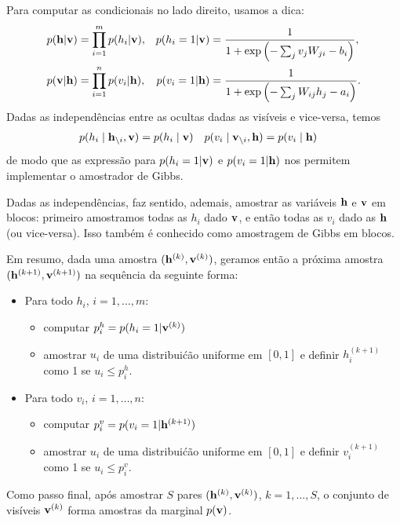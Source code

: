 \begin{solution}
    Para computar as condicionais no lado direito, usamos a dica:
    \begin{align}
        p(\mathbf{h} | \mathbf{v}) &= \prod_{i=1}^m p(h_i | \mathbf{v}), &  p(h_i=1 | \mathbf{v}) & =  \frac{1}{ 1+  \exp\left(- \sum_j v_j W_{ji} - b_i \right)}, \\
        p(\mathbf{v} | \mathbf{h}) &= \prod_{i=1}^n p(v_i | \mathbf{h}), &  p(v_i = 1 | \mathbf{h}) &= \frac{1}{1+\exp\left(-\sum_j W_{ij} h_j-a_i\right)}.
    \end{align}
    Dadas as independ\^encias entre as ocultas dadas as vis\'iveis e vice-versa, temos
    \begin{align}
        p(h_i \mid \mathbf{h}_{\backslash i}, \mathbf{v}) & = p(h_i \mid \mathbf{v}) &   p(v_i \mid \mathbf{v}_{\backslash i}, \mathbf{h}) & = p(v_i \mid \mathbf{h})
    \end{align}
    de modo que as express\~ao para $p(h_i=1 | \mathbf{v})$ e $p(v_i = 1 | \mathbf{h})$ nos permitem implementar o amostrador de Gibbs.
    
    Dadas as independ\^encias, faz sentido, ademais, amostrar as vari\'aveis $\mathbf{h}$
    e $\mathbf{v}$ em blocos: primeiro amostramos todas as $h_i$ dado
    $\mathbf{v}$, e ent\~ao todas as $v_i$ dado as $\mathbf{h}$ (ou vice-versa). Isso
    tamb\'em \'e conhecido como amostragem de Gibbs em blocos.
    
    Em resumo, dada uma amostra $(\mathbf{h}^{(k)},\mathbf{v}^{(k)})$, geramos ent\~ao a pr\'oxima amostra
    $(\mathbf{h}^{(k+1)},\mathbf{v}^{(k+1)})$ na sequ\^encia da seguinte forma:
    \begin{itemize}
        \item Para todo $h_i$, $i=1, \ldots, m$:
        \begin{itemize}
            \item computar $p^h_i = p(h_i=1 | \mathbf{v}^{(k)})$
            \item amostrar $u_i$ de uma distribui\'c\~ao uniforme em $[0,1]$ e definir $h^{(k+1)}_i$ como 1 se $u_i \le p^h_i$.
        \end{itemize}
        \item Para todo $v_i$, $i=1, \ldots, n$:
        \begin{itemize}
            \item computar $p^v_i = p(v_i=1 | \mathbf{h}^{(k+1)})$
            \item amostrar $u_i$ de uma distribui\'c\~ao uniforme em $[0,1]$ e definir $v^{(k+1)}_i$ como 1 se $u_i \le p^v_i$.
        \end{itemize}
    \end{itemize}
    Como passo final, ap\'os amostrar $S$ pares $(\mathbf{h}^{(k)},\mathbf{v}^{(k)})$, $k=1,
    \ldots, S$, o conjunto de vis\'iveis $\mathbf{v}^{(k)}$ forma amostras da
    marginal $p(\mathbf{v})$.
\end{solution}



